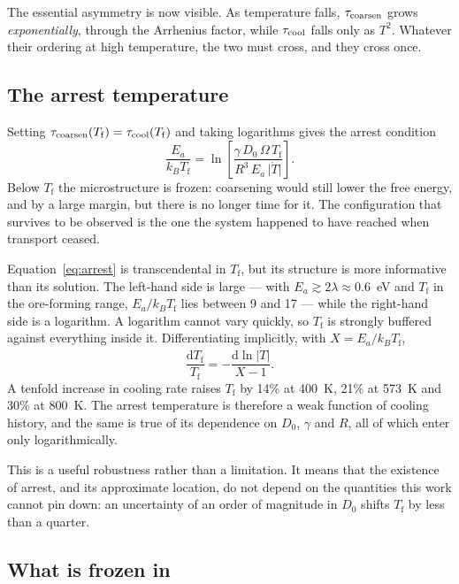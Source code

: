 \documentclass[preprint,12pt,authoryear]{elsarticle}
\newcommand{\Tf}{T_{\mathrm{f}}}
\begin{document}
The essential asymmetry is now visible. As temperature falls,
$\tau_{\rm coarsen}$ grows \emph{exponentially}, through the Arrhenius factor,
while $\tau_{\rm cool}$ falls only as $T^2$. Whatever their ordering at high
temperature, the two must cross, and they cross once.

\subsection{The arrest temperature}

Setting $\tau_{\rm coarsen}(\Tf) = \tau_{\rm cool}(\Tf)$ and taking logarithms
gives the arrest condition
\begin{equation}
\frac{E_a}{k_B \Tf}
 = \ln\!\left[ \frac{\gamma\, D_0\, \Omega\, \Tf}
                    {R^3\, E_a\, \lvert \dot{T} \rvert} \right].
\label{eq:arrest}
\end{equation}
Below $\Tf$ the microstructure is frozen: coarsening would still lower the free
energy, and by a large margin, but there is no longer time for it. The
configuration that survives to be observed is the one the system happened to
have reached when transport ceased.

Equation~\eqref{eq:arrest} is transcendental in $\Tf$, but its structure is more
informative than its solution. The left-hand side is large --- with
$E_a \gtrsim 2\lambda \approx 0.6$~eV and $\Tf$ in the ore-forming range,
$E_a/k_B\Tf$ lies between 9 and 17 --- while the right-hand side is a logarithm.
A logarithm cannot vary quickly, so $\Tf$ is strongly buffered against
everything inside it. Differentiating implicitly, with $X = E_a/k_B\Tf$,
\begin{equation}
\frac{\mathrm{d}\Tf}{\Tf} = -\frac{\mathrm{d}\ln \lvert\dot{T}\rvert}{X - 1}.
\label{eq:tfsens}
\end{equation}
A tenfold increase in cooling rate raises $\Tf$ by 14\% at 400~K, 21\% at
573~K and 30\% at 800~K. The arrest temperature is therefore a weak function of
cooling history, and the same is true of its dependence on $D_0$, $\gamma$ and
$R$, all of which enter only logarithmically.

This is a useful robustness rather than a limitation. It means that the
existence of arrest, and its approximate location, do not depend on the
quantities this work cannot pin down: an uncertainty of an order of magnitude in
$D_0$ shifts $\Tf$ by less than a quarter.

\subsection{What is frozen in}
\end{document}
